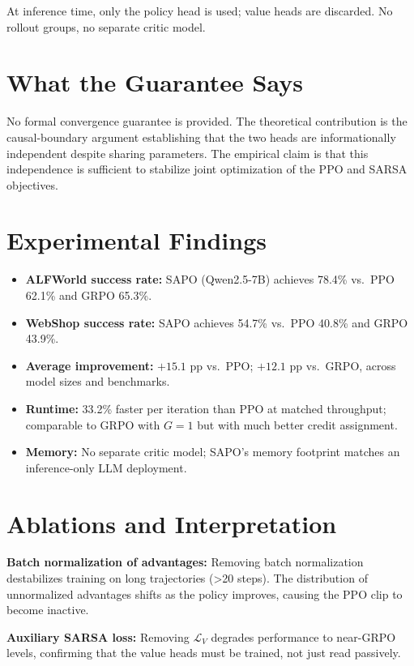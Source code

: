 \documentclass[10pt,twocolumn]{article}
\begin{document}
At inference time, only the policy head is used; value heads are
discarded. No rollout groups, no separate critic model.

\section{What the Guarantee Says}

No formal convergence guarantee is provided. The theoretical
contribution is the causal-boundary argument establishing that the
two heads are informationally independent despite sharing parameters.
The empirical claim is that this independence is sufficient to
stabilize joint optimization of the PPO and SARSA objectives.

\section{Experimental Findings}

\begin{itemize}[itemsep=2pt,parsep=0pt]
  \item \textbf{ALFWorld success rate:} SAPO (Qwen2.5-7B) achieves
    78.4\% vs.\ PPO 62.1\% and GRPO 65.3\%.
  \item \textbf{WebShop success rate:} SAPO achieves 54.7\% vs.\
    PPO 40.8\% and GRPO 43.9\%.
  \item \textbf{Average improvement:} $+15.1$ pp vs.\ PPO;
    $+12.1$ pp vs.\ GRPO, across model sizes and benchmarks.
  \item \textbf{Runtime:} 33.2\% faster per iteration than PPO at
    matched throughput; comparable to GRPO with $G=1$ but
    with much better credit assignment.
  \item \textbf{Memory:} No separate critic model; SAPO's memory
    footprint matches an inference-only LLM deployment.
\end{itemize}

\section{Ablations and Interpretation}

\textbf{Batch normalization of advantages:} Removing batch
normalization destabilizes training on long trajectories (>20 steps).
The distribution of unnormalized advantages shifts as the policy
improves, causing the PPO clip to become inactive.

\textbf{Auxiliary SARSA loss:} Removing $\mathcal{L}_V$ degrades
performance to near-GRPO levels, confirming that the value heads must
be trained, not just read passively.
\end{document}
